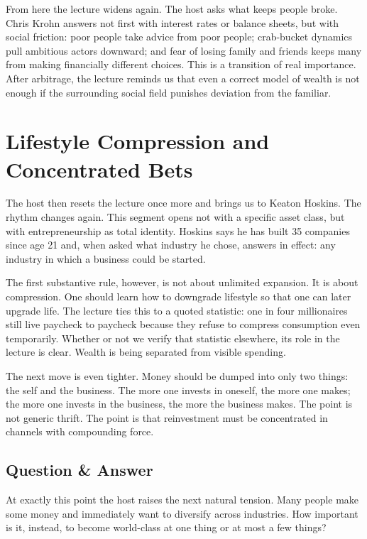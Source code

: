 From here the lecture widens again. The host asks what keeps people broke. Chris Krohn answers not first with interest rates or balance sheets, but with social friction: poor people take advice from poor people; crab-bucket dynamics pull ambitious actors downward; and fear of losing family and friends keeps many from making financially different choices. This is a transition of real importance. After arbitrage, the lecture reminds us that even a correct model of wealth is not enough if the surrounding social field punishes deviation from the familiar.

\section{Lifestyle Compression and Concentrated Bets}

The host then resets the lecture once more and brings us to Keaton Hoskins. The rhythm changes again. This segment opens not with a specific asset class, but with entrepreneurship as total identity. Hoskins says he has built 35 companies since age 21 and, when asked what industry he chose, answers in effect: any industry in which a business could be started.

The first substantive rule, however, is not about unlimited expansion. It is about compression. One should learn how to downgrade lifestyle so that one can later upgrade life. The lecture ties this to a quoted statistic: one in four millionaires still live paycheck to paycheck because they refuse to compress consumption even temporarily. Whether or not we verify that statistic elsewhere, its role in the lecture is clear. Wealth is being separated from visible spending.

The next move is even tighter. Money should be dumped into only two things: the self and the business. The more one invests in oneself, the more one makes; the more one invests in the business, the more the business makes. The point is not generic thrift. The point is that reinvestment must be concentrated in channels with compounding force.

\subsection{Question \& Answer}

At exactly this point the host raises the next natural tension. Many people make some money and immediately want to diversify across industries. How important is it, instead, to become world-class at one thing or at most a few things?


